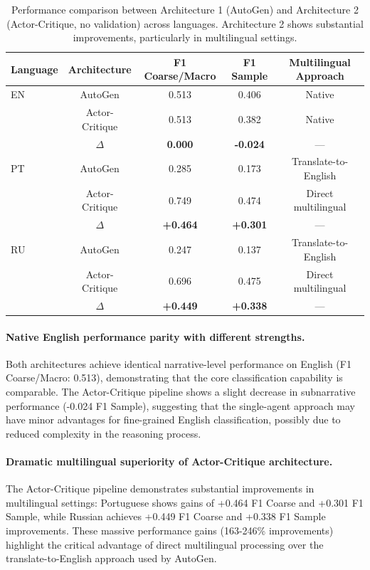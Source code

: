 \begin{table}[htbp]
\centering
\caption{Performance comparison between Architecture 1 (AutoGen) and Architecture 2 (Actor-Critique, no validation) across languages. Architecture 2 shows substantial improvements, particularly in multilingual settings.}
\label{tab:architecture_comparison}
\small
\begin{tabular}{lcccc}
\hline
\textbf{Language} & \textbf{Architecture} & \textbf{F1 Coarse/Macro} & \textbf{F1 Sample} & \textbf{Multilingual Approach} \\
\hline
EN & AutoGen & 0.513 & 0.406 & Native \\
   & Actor-Critique & 0.513 & 0.382 & Native \\
   & \textbf{$\Delta$} & \textbf{0.000} & \textbf{-0.024} & --- \\
\hline
PT & AutoGen & 0.285 & 0.173 & Translate-to-English \\
   & Actor-Critique & 0.749 & 0.474 & Direct multilingual \\
   & \textbf{$\Delta$} & \textbf{+0.464} & \textbf{+0.301} & --- \\
\hline
RU & AutoGen & 0.247 & 0.137 & Translate-to-English \\
   & Actor-Critique & 0.696 & 0.475 & Direct multilingual \\
   & \textbf{$\Delta$} & \textbf{+0.449} & \textbf{+0.338} & --- \\
\hline
\end{tabular}
\end{table}

\paragraph{Native English performance parity with different strengths.} Both architectures achieve identical narrative-level performance on English (F1 Coarse/Macro: 0.513), demonstrating that the core classification capability is comparable. The Actor-Critique pipeline shows a slight decrease in subnarrative performance (-0.024 F1 Sample), suggesting that the single-agent approach may have minor advantages for fine-grained English classification, possibly due to reduced complexity in the reasoning process.

\paragraph{Dramatic multilingual superiority of Actor-Critique architecture.} The Actor-Critique pipeline demonstrates substantial improvements in multilingual settings: Portuguese shows gains of +0.464 F1 Coarse and +0.301 F1 Sample, while Russian achieves +0.449 F1 Coarse and +0.338 F1 Sample improvements. These massive performance gains (163-246\% improvements) highlight the critical advantage of direct multilingual processing over the translate-to-English approach used by AutoGen.

